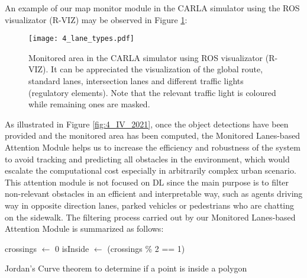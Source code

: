 An example of our map monitor module in the CARLA simulator \cite{dosovitskiy2017carla} using the ROS \cite{quigley2009ros} visualizator (R-VIZ) may be observed in Figure \ref{fig:4_monitored_area_CARLA_ROS}:

\begin{figure}[!ht] 
	\centering
	\texttt{[image: 4\_lane\_types.pdf]}
	\caption[Monitored area in the CARLA simulator using ROS visualizator (R-VIZ)]{Monitored area in the CARLA simulator using ROS visualizator (R-VIZ). It can be appreciated the visualization of the global route, standard lanes, intersection lanes and different traffic lights (regulatory elements). Note that the relevant traffic light is coloured while remaining ones are masked.}
	\label{fig:4_monitored_area_CARLA_ROS}
\end{figure}

As illustrated in Figure \ref{fig:4_IV_2021}, once the object detections have been provided and the monitored area has been computed, the Monitored Lanes-based Attention Module helps us to increase the efficiency and robustness of the system to avoid tracking and predicting all obstacles in the environment, which would escalate the computational cost especially in arbitrarily complex urban scenario. This attention module is not focused on \ac{DL} since the main purpose is to filter non-relevant obstacles in an efficient and interpretable way, such as agents driving way in opposite direction lanes, parked vehicles or pedestrians who are chatting on the sidewalk. The filtering process carried out by our Monitored Lanes-based Attention Module is summarized as follows:

\begin{algorithm}[H]
	\SetAlgoLined
	crossings $\leftarrow$ 0\;
	isInside $\leftarrow$ (crossings \% 2 == 1)\;
	\;
	\caption{Jordan's Curve theorem to determine if a point is inside a polygon}
	\label{alg:4_jordan_curve_theorem}
\end{algorithm}

